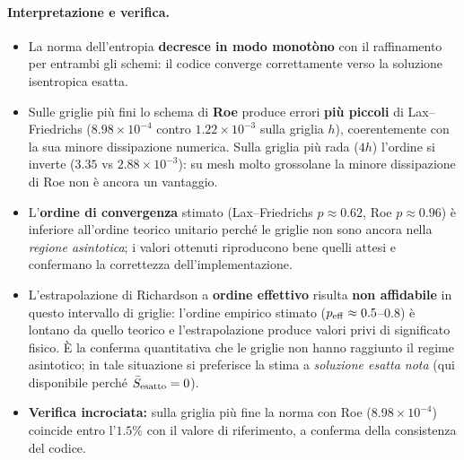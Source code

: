 \paragraph{Interpretazione e verifica.}
\begin{itemize}
  \item La norma dell'entropia \textbf{decresce in modo monotòno} con il raffinamento per
    entrambi gli schemi: il codice converge correttamente verso la soluzione isentropica esatta.
  \item Sulle griglie più fini lo schema di \textbf{Roe} produce errori \textbf{più piccoli} di
    Lax--Friedrichs ($8.98\times10^{-4}$ contro $1.22\times10^{-3}$ sulla griglia $h$), coerentemente
    con la sua minore dissipazione numerica. Sulla griglia più rada ($4h$) l'ordine si inverte
    ($3.35$ vs $2.88\times10^{-3}$): su mesh molto grossolane la minore dissipazione di Roe non è
    ancora un vantaggio.
  \item L'\textbf{ordine di convergenza} stimato (Lax--Friedrichs $p\approx0.62$, Roe
    $p\approx0.96$) è inferiore all'ordine teorico unitario perché le griglie non sono ancora nella
    \emph{regione asintotica}; i valori ottenuti riproducono bene quelli attesi e confermano la
    correttezza dell'implementazione.
  \item L'estrapolazione di Richardson a \textbf{ordine effettivo} risulta \textbf{non affidabile}
    in questo intervallo di griglie: l'ordine empirico stimato ($p_{\rm eff}\approx0.5$--$0.8$) è
    lontano da quello teorico e l'estrapolazione produce valori privi di significato fisico. È la
    conferma quantitativa che le griglie non hanno raggiunto il regime asintotico; in tale
    situazione si preferisce la stima a \emph{soluzione esatta nota} (qui disponibile perché
    $\bar S_{\rm esatto}=0$).
  \item \textbf{Verifica incrociata:} sulla griglia più fine la norma con Roe ($8.98\times10^{-4}$)
    coincide entro l'$1.5\%$ con il valore di riferimento, a conferma della consistenza del codice.
\end{itemize}

